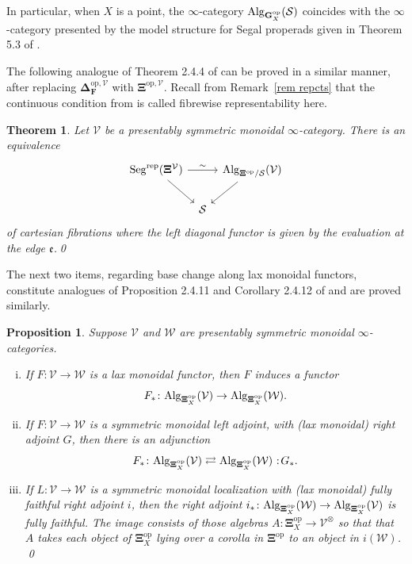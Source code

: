\documentclass{amsart}
\numberwithin{theorem}{subsection}
\newtheorem{thm}[theorem]{Theorem}
\newtheorem{propn}[theorem]{Proposition}
\theoremstyle{definition}
\providecommand{\op}{\mathrm{op}}
\newcommand{\finsetskel}{\mathbf{F}}
\newcommand{\xS}{\mathcal{S}}
\newcommand{\xV}{\mathcal{V}}
\newcommand{\xW}{\mathcal{W}}
\newcommand{\xfe}{\mathfrak{e}}
\newcommand*\cocolon{%
	\nobreak
	\mskip6mu plus1mu
	\mathpunct{}%
	\nonscript
	\mkern-\thinmuskip
	{:}%
	\mskip2mu
	\relax
}
\newcommand{\icat}{$\infty$-category}
\newcommand{\name}[1]{\ensuremath{\text{\textup{#1}}}}
\newcommand{\simp}{\mathbf{\Delta}}
\newcommand{\bbY}{\mathbf{G}}
\newcommand{\gc}{\mathbf{\Xi}}
\newcommand{\gcV}{\gc^{\xV}}
\newcommand{\opgcV}{\gc^{\op,\xV}}
\newcommand{\Seg}{\name{Seg}}
\newcommand{\Alg}{\name{Alg}}
\newcommand{\Segrep}{\Seg^{\name{rep}}}
\begin{document}
In particular, when $X$ is a point, the \icat{} $\Alg_{\bbY^\op_X}(\xS)$ coincides with the \icat{} presented by the model structure for Segal properads given in Theorem 5.3 of \cite{hry_factorizations}.

The following analogue of Theorem 2.4.4 of \cite{ChuHaugseng} can be proved in a similar manner, after replacing $\simp_{\finsetskel}^{\op, \xV}$ with $\opgcV$.
Recall from Remark~\ref{rem repcts} that the continuous condition from \cite{ChuHaugseng} is called fibrewise representability here.
\begin{thm}\label{thm:PCSisAlgLT}
	Let $\xV$ be a presentably symmetric monoidal \icat{}. There is an equivalence 
	\[
 \begin{tikzcd}[column sep=tiny]
  \Segrep(\gcV)\arrow{dr} \arrow{rr}{\sim} &
    & \Alg_{\gc^\op/\xS}(\xV) \arrow{dl} \\
    & \xS
 \end{tikzcd}
 \]
of cartesian fibrations where the left diagonal functor is given by the evaluation at the edge $\xfe$.\qed
\end{thm}

The next two items, regarding base change along lax monoidal functors, constitute analogues of Proposition 2.4.11 and Corollary 2.4.12 of \cite{ChuHaugseng} and are proved similarly.

\begin{propn}
Suppose $\xV$ and $\xW$ are presentably symmetric monoidal $\infty$-categories.
	\begin{enumerate}[(i)]
		\item If $F \colon \xV \to \xW$ is a lax monoidal functor, then $F$ induces a functor \[F_{*} \colon \Alg_{\gc^\op_X}(\xV) \to \Alg_{\gc^\op_X}(\xW).\]
		\item If $F \colon \xV \to \xW$ is a symmetric monoidal left adjoint, with (lax monoidal) right adjoint $G$, then there is an adjunction
		\[ F_{*} \colon \Alg_{\gc^\op_X}(\xV) \rightleftarrows \Alg_{\gc^\op_X}(\xW)\cocolon G_{*}.\]
		\item If $L \colon \xV \to \xW$ is a symmetric monoidal localization with (lax monoidal) fully faithful right adjoint $i$, then the right adjoint $i_{*} \colon \Alg_{\gc^\op_X}(\xW) \to \Alg_{\gc^\op_X}(\xV)$ is fully faithful.
		The image consists of those algebras $A \colon \gc^\op_X \to \xV^\otimes$ so that that $A$ takes each object of $\gc^\op_X$ lying over a corolla in $\gc^\op$ to an object in $i(\xW)$. \qed
	\end{enumerate}
\end{propn}
\end{document}
